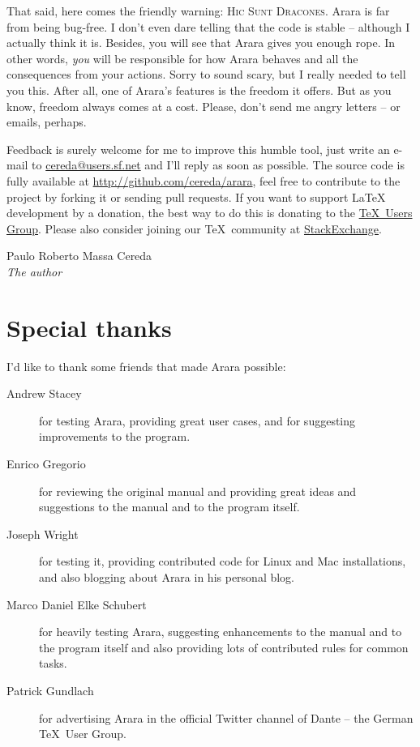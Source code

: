 \documentclass[a4paper,twoside,12pt]{memoir}
\begin{document}
That said, here comes the friendly warning: \textsc{Hic Sunt Dracones}. Arara is far from being bug-free. I don't even dare telling that the code is stable -- although I actually think it is. Besides, you will see that Arara gives you enough rope. In other words, \emph{you} will be responsible for how Arara behaves and all the consequences from your actions. Sorry to sound scary, but I really needed to tell you this. After all, one of Arara's features is the freedom it offers. But as you know, freedom always comes at a cost. Please, don't send me angry letters -- or emails, perhaps.

Feedback is surely welcome for me to improve this humble tool, just write an e-mail to \url{cereda@users.sf.net} and I'll reply as soon as possible. The source code is fully available at \url{http://github.com/cereda/arara}, feel free to contribute to the project by forking it or sending pull requests. If you want to support \LaTeX{} development by a donation, the best way to do this is donating to the \href{http://www.tug.org/}{\TeX\ Users Group}. Please also consider joining our \TeX\ community at \href{http://tex.stackexchange.com}{StackExchange}.

\vfill

\begin{flushright}
Paulo Roberto Massa Cereda\\
\emph{The author}
\end{flushright}

\cleardoublepage

\section*{Special thanks}

I'd like to thank some friends that made Arara possible:

\begin{description}
\item[Andrew Stacey] for testing Arara, providing great user cases, and for suggesting improvements to the program.
\item[Enrico Gregorio] for reviewing the original manual and providing great ideas and suggestions to the manual and to the program itself.
\item[Joseph Wright] for testing it, providing contributed code for Linux and Mac installations, and also blogging about Arara in his personal blog.
\item[Marco Daniel Elke Schubert] for heavily testing Arara, suggesting enhancements to the manual and to the program itself and also providing lots of contributed rules for common tasks.
\item[Patrick Gundlach] for advertising Arara in the official Twitter channel of Dante -- the German \TeX\ User Group.
\end{description}
\end{document}
